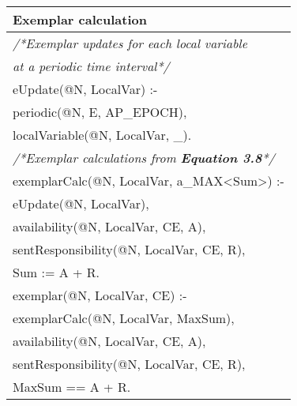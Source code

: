 \documentclass[letterpaper,twocolumn,11pt]{article}
\begin{document}
\begin{tabular}{|l|}
\hline
\rowcolor{myblue} Exemplar calculation\\
\hline
\scriptsize{\textit{/*Exemplar updates for each local variable}}\\
\scriptsize{\textit{at a periodic time interval*/}}\\
\scriptsize{eUpdate(@N, LocalVar) :-}\\
\scriptsize{ \hspace{0.5cm}        periodic(@N, E, AP\_EPOCH),}\\
\scriptsize{ \hspace{0.5cm}         localVariable(@N, LocalVar, \_).}\\

\scriptsize{\textit{/*Exemplar calculations from \textbf{Equation 3.8}*/}}\\
\scriptsize{exemplarCalc(@N, LocalVar, a\_MAX\textless{}Sum\textgreater{}) :- }\\
\scriptsize{ \hspace{0.5cm}         eUpdate(@N, LocalVar),}\\
\scriptsize{ \hspace{0.5cm}         availability(@N, LocalVar, CE, A),}\\
\scriptsize{ \hspace{0.5cm}         sentResponsibility(@N, LocalVar, CE, R),}\\
\scriptsize{ \hspace{0.5cm}         Sum := A + R.}\\

\scriptsize{exemplar(@N, LocalVar, CE) :-}\\
\scriptsize{ \hspace{0.5cm}         exemplarCalc(@N, LocalVar, MaxSum),}\\
\scriptsize{ \hspace{0.5cm}         availability(@N, LocalVar, CE, A),}\\
\scriptsize{ \hspace{0.5cm}         sentResponsibility(@N, LocalVar, CE, R),}\\
\scriptsize{ \hspace{0.5cm}         MaxSum == A + R.}\\
\hline
\end{tabular}
\end{document}
